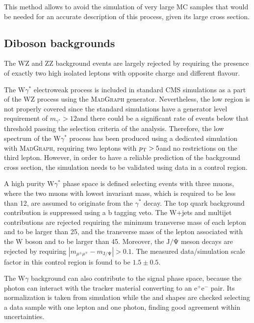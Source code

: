 This method allows to avoid the simulation of very large MC samples that would be needed for an accurate description of this process, given its large cross section. 





\subsection{Diboson backgrounds\label{sec:diboson}}

The WZ and ZZ background events are largely rejected by requiring the presence of exactly two high \pt isolated leptons with opposite charge and different flavour. 

The W$\gamma^*$ electroweak process is included in standard CMS simulations as a part of the WZ
process using the \textsc{MadGraph} generator. Nevertheless, the low \mll region is not properly covered since the standard simulations have a generator level requirement of $m_{\gamma^*}>12$\GeV and there could be a significant rate of events below that threshold passing the selection criteria of the analysis. Therefore, the low \mll spectrum of the W$\gamma^*$ process has been produced using a dedicated simulation with \textsc{MadGraph}, requiring two leptons with $p_\mathrm{T} > 5$\GeV and no restrictions on the third lepton. However, in order to have a reliable prediction of the background cross section, the simulation needs to be validated using data in a control region.

A high purity W$\gamma^*$ phase space is defined selecting events with three muons, where the two muons with lowest invariant mass, which is required to be less than 12\GeV, are assumed to originate from the $\gamma^*$ decay. The top quark background contribution is suppressed using a b tagging veto. The W+jets and multijet contributions are rejected requiring the minimum transverse mass of each lepton and \MET to be larger than 25\GeV, and the transverse mass of the lepton associated with the W boson and \MET to be larger than 45\GeV. Moreover, the $\mathrm{J/\Psi}$ meson decays are rejected by requiring $|m_{\mu^{\pm}\mu^{\mp}} - m_\mathrm{J/\Psi}|>0.1$\GeV.
The measured data/simulation scale factor in this control region is found to be $1.5 \pm 0.5$.

The W$\gamma$ background can also contribute to the signal phase space, because the photon can interact with the tracker material converting to an $\mathrm{e^+e^-}$ pair. Its normalization is taken from simulation while the \mll and \mt shapes are checked selecting a data sample with one lepton and one photon, finding good agreement within uncertainties.

